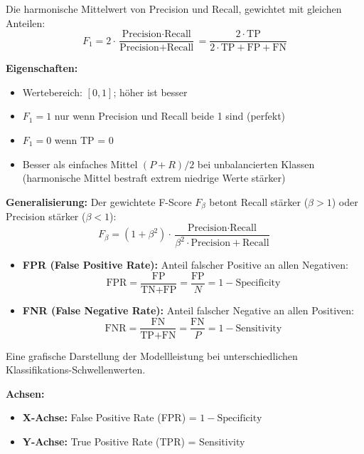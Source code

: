 Die harmonische Mittelwert von Precision und Recall, gewichtet mit gleichen Anteilen:
$$F_1 = 2 \cdot \frac{\text{Precision} \cdot \text{Recall}}{\text{Precision} + \text{Recall}} = \frac{2 \cdot \text{TP}}{2 \cdot \text{TP} + \text{FP} + \text{FN}}$$

\textbf{Eigenschaften:}
\begin{itemize}[leftmargin=1.5em]
    \item Wertebereich: $[0, 1]$; höher ist besser
    \item $F_1 = 1$ nur wenn Precision und Recall beide 1 sind (perfekt)
    \item $F_1 = 0$ wenn TP = 0
    \item Besser als einfaches Mittel $(P + R)/2$ bei unbalancierten Klassen (harmonische Mittel bestraft extrem niedrige Werte stärker)
\end{itemize}

\textbf{Generalisierung:} Der gewichtete F-Score $F_\beta$ betont Recall stärker ($\beta > 1$) oder Precision stärker ($\beta < 1$):
$$F_\beta = (1 + \beta^2) \cdot \frac{\text{Precision} \cdot \text{Recall}}{\beta^2 \cdot \text{Precision} + \text{Recall}}$$

\begin{itemize}[leftmargin=1.5em]
    \item \textbf{FPR (False Positive Rate):} Anteil falscher Positive an allen Negativen:
    $$\text{FPR} = \frac{\text{FP}}{\text{TN} + \text{FP}} = \frac{\text{FP}}{N} = 1 - \text{Specificity}$$
    
    \item \textbf{FNR (False Negative Rate):} Anteil falscher Negative an allen Positiven:
    $$\text{FNR} = \frac{\text{FN}}{\text{TP} + \text{FN}} = \frac{\text{FN}}{P} = 1 - \text{Sensitivity}$$
\end{itemize}

Eine grafische Darstellung der Modellleistung bei unterschiedlichen Klassifikations-Schwellenwerten.

\textbf{Achsen:}
\begin{itemize}[leftmargin=1.5em]
    \item \textbf{X-Achse:} False Positive Rate (FPR) = $1 - \text{Specificity}$
    \item \textbf{Y-Achse:} True Positive Rate (TPR) = Sensitivity
\end{itemize}

